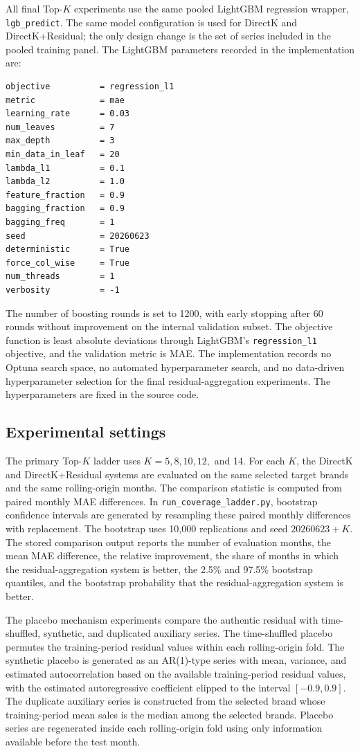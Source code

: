 All final Top-\(K\) experiments use the same pooled LightGBM regression wrapper, \texttt{lgb\_predict}. The same model configuration is used for DirectK and DirectK+Residual; the only design change is the set of series included in the pooled training panel. The LightGBM parameters recorded in the implementation are:

\begin{verbatim}
objective          = regression_l1
metric             = mae
learning_rate      = 0.03
num_leaves         = 7
max_depth          = 3
min_data_in_leaf   = 20
lambda_l1          = 0.1
lambda_l2          = 1.0
feature_fraction   = 0.9
bagging_fraction   = 0.9
bagging_freq       = 1
seed               = 20260623
deterministic      = True
force_col_wise     = True
num_threads        = 1
verbosity          = -1
\end{verbatim}

The number of boosting rounds is set to 1200, with early stopping after 60 rounds without improvement on the internal validation subset. The objective function is least absolute deviations through LightGBM's \texttt{regression\_l1} objective, and the validation metric is MAE. The implementation records no Optuna search space, no automated hyperparameter search, and no data-driven hyperparameter selection for the final residual-aggregation experiments. The hyperparameters are fixed in the source code.

\subsection{Experimental settings}
\label{app:experimental-settings}

The primary Top-\(K\) ladder uses \(K = 5, 8, 10, 12,\) and 14. For each \(K\), the DirectK and DirectK+Residual systems are evaluated on the same selected target brands and the same rolling-origin months. The comparison statistic is computed from paired monthly MAE differences. In \texttt{run\_coverage\_ladder.py}, bootstrap confidence intervals are generated by resampling these paired monthly differences with replacement. The bootstrap uses 10,000 replications and seed \(20260623 + K\). The stored comparison output reports the number of evaluation months, the mean MAE difference, the relative improvement, the share of months in which the residual-aggregation system is better, the 2.5\% and 97.5\% bootstrap quantiles, and the bootstrap probability that the residual-aggregation system is better.

The placebo mechanism experiments compare the authentic residual with time-shuffled, synthetic, and duplicated auxiliary series. The time-shuffled placebo permutes the training-period residual values within each rolling-origin fold. The synthetic placebo is generated as an AR(1)-type series with mean, variance, and estimated autocorrelation based on the available training-period residual values, with the estimated autoregressive coefficient clipped to the interval \([-0.9,0.9]\). The duplicate auxiliary series is constructed from the selected brand whose training-period mean sales is the median among the selected brands. Placebo series are regenerated inside each rolling-origin fold using only information available before the test month.

